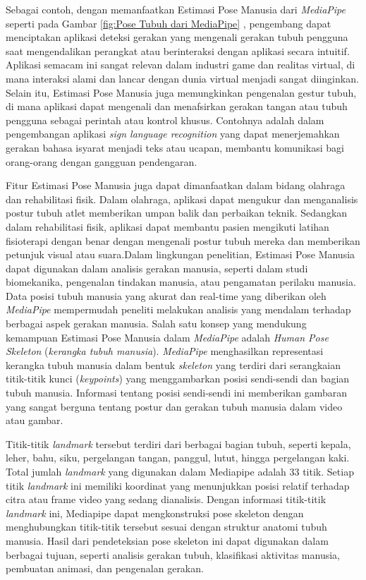 Sebagai contoh, dengan memanfaatkan Estimasi Pose Manusia dari \textit{MediaPipe} seperti pada Gambar \ref{fig:Pose Tubuh dari MediaPipe} , pengembang dapat menciptakan aplikasi deteksi gerakan yang mengenali gerakan tubuh pengguna saat mengendalikan perangkat atau berinteraksi dengan aplikasi secara intuitif. Aplikasi semacam ini sangat relevan dalam industri game dan realitas virtual, di mana interaksi alami dan lancar dengan dunia virtual menjadi sangat diinginkan. Selain itu, Estimasi Pose Manusia juga memungkinkan pengenalan gestur tubuh, di mana aplikasi dapat mengenali dan menafsirkan gerakan tangan atau tubuh pengguna sebagai perintah atau kontrol khusus. Contohnya adalah dalam pengembangan aplikasi \textit{sign language recognition} yang dapat menerjemahkan gerakan bahasa isyarat menjadi teks atau ucapan, membantu komunikasi bagi orang-orang dengan gangguan pendengaran. \cite{singh2021real}

Fitur Estimasi Pose Manusia juga dapat dimanfaatkan dalam bidang olahraga dan rehabilitasi fisik. Dalam olahraga, aplikasi dapat mengukur dan menganalisis postur tubuh atlet memberikan umpan balik dan perbaikan teknik. Sedangkan dalam rehabilitasi fisik, aplikasi dapat membantu pasien mengikuti latihan fisioterapi dengan benar dengan mengenali postur tubuh mereka dan memberikan petunjuk visual atau suara.Dalam lingkungan penelitian, Estimasi Pose Manusia dapat digunakan dalam analisis gerakan manusia, seperti dalam studi biomekanika, pengenalan tindakan manusia, atau pengamatan perilaku manusia. Data posisi tubuh manusia yang akurat dan real-time yang diberikan oleh \textit{MediaPipe} mempermudah peneliti melakukan analisis yang mendalam terhadap berbagai aspek gerakan manusia. Salah satu konsep yang mendukung kemampuan Estimasi Pose Manusia dalam \textit{MediaPipe} adalah \textit{Human Pose Skeleton} (\textit{kerangka tubuh manusia}). \textit{MediaPipe} menghasilkan representasi kerangka tubuh manusia dalam bentuk \textit{skeleton} yang terdiri dari serangkaian titik-titik kunci (\textit{keypoints}) yang menggambarkan posisi sendi-sendi dan bagian tubuh manusia. Informasi tentang posisi sendi-sendi ini memberikan gambaran yang sangat berguna tentang postur dan gerakan tubuh manusia dalam video atau gambar. 

Titik-titik \textit{landmark} tersebut terdiri dari berbagai bagian tubuh, seperti kepala, leher, bahu, siku, pergelangan tangan, panggul, lutut, hingga pergelangan kaki. Total jumlah \textit{landmark} yang digunakan dalam Mediapipe adalah 33 titik. Setiap titik \textit{landmark} ini memiliki koordinat yang menunjukkan posisi relatif terhadap citra atau frame video yang sedang dianalisis. Dengan informasi titik-titik \textit{landmark} ini, Mediapipe dapat mengkonstruksi pose skeleton dengan menghubungkan titik-titik tersebut sesuai dengan struktur anatomi tubuh manusia. Hasil dari pendeteksian pose skeleton ini dapat digunakan dalam berbagai tujuan, seperti analisis gerakan tubuh, klasifikasi aktivitas manusia, pembuatan animasi, dan pengenalan gerakan.

